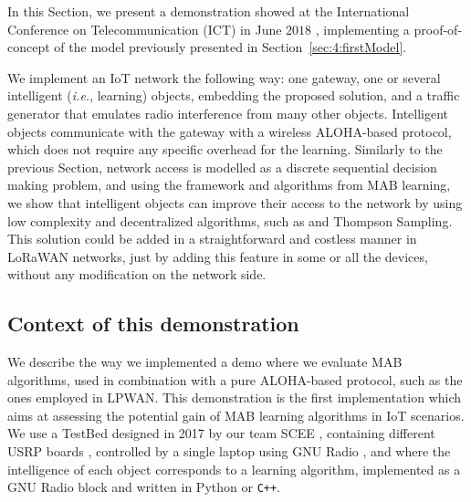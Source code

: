 

\graphicspath{{2-Chapters/4-Chapter/IEEE_WCNC_2019__DemoICT.git/pictures/}}

In this Section, we present a demonstration showed at the International Conference on Telecommunication (ICT) in June $2018$ \cite{Besson2018ICT,Besson2019WCNC}, implementing a proof-of-concept of the model previously presented in Section~\ref{sec:4:firstModel}.

We implement an IoT network the following way: one gateway, one or several intelligent (\emph{i.e.}, learning) objects, embedding the proposed solution,
and a traffic generator that emulates radio interference from many other objects.
Intelligent objects communicate with the gateway with a wireless ALOHA-based protocol, which does not require any specific overhead for the learning.
%
Similarly to the previous Section, network access is modelled as a discrete sequential decision making problem, and using the framework and algorithms from MAB learning, we show that intelligent objects can improve their access to the network by using low complexity and decentralized algorithms, such as \UCB{} and Thompson Sampling.
%
This solution could be added in a straightforward and costless manner in LoRaWAN networks, just by adding this feature in some or all the devices, without any modification on the network side.


\subsection{Context of this demonstration}
\label{sub:42:motivation}

We describe the way we implemented a demo where we evaluate MAB algorithms, used in combination with a pure ALOHA-based protocol, such as the ones employed in LPWAN.
This demonstration is the first implementation which aims at assessing the potential gain of MAB learning algorithms in IoT scenarios.
%
We use a TestBed designed in 2017 by our team SCEE \cite[Appendix~3]{Bodinier17}, containing different USRP boards \cite{USRPDocumentation}, controlled by a single laptop using GNU Radio \cite{GNURadioDocumentation},
and where the intelligence of each object corresponds to a learning algorithm, implemented as a GNU Radio block \cite{GNURadioCompanionDocumentation} and written in Python or \texttt{C++}.

